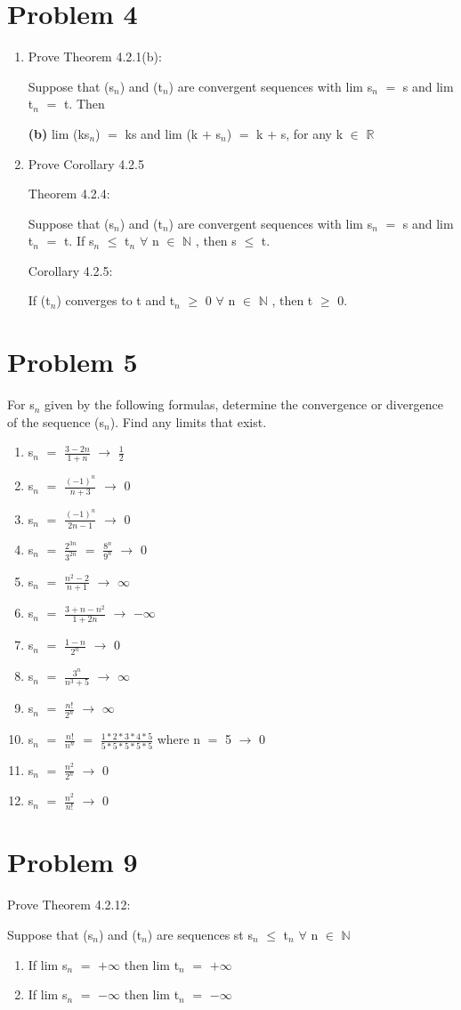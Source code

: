 \documentclass{article}
\newcommand{\mt}[1]{\ensuremath{#1}}
\newcommand\bsc[2][\DefaultOpt]{%
  \def\DefaultOpt{#2}%
  \section[#1]{#2}%
}
\newcommand{\balist}{\begin{enumerate}[label=\alph*.]}
\newcommand{\elist}{\end{enumerate}}
\newcommand{\bpth}[1]{\textbf{(#1)}}
\newcommand{\br}{\mt{\mathbb{R}} }       %
\newcommand{\bn}{\mt{\mathbb{N}} }       %
\newcommand{\fa}{\mt{\forall} }          %
\newcommand{\mem}{\mt{\in} }
\newcommand{\lra}{ \mt{\longrightarrow} } %
\newcommand{\prn}[1]{(#1)}
\newcommand{\ps}{\mt{+} }
\newcommand{\lse}{\mt{\leq} }
\newcommand{\gre}{\mt{\geq} }
\newcommand{\eql}{\mt{=} }
\newcommand{\uw}[2]{#1\mt{_{#2}}}
\newcommand{\frc}[2]{\mt{\frac{#1}{#2}}}
\begin{document}
\bsc{Problem 4}{
\balist
\item Prove Theorem 4.2.1(b):
	
	Suppose that \prn{\uw{s}{n}} and (\uw{t}{n}) are convergent sequences with lim \uw{s}{n} \eql s and lim \uw{t}{n} \eql t. Then
	
	\bpth{b} lim (k\uw{s}{n}) \eql ks and lim (k \ps \uw{s}{n}) \eql k \ps s, for any k \mem \br
	
	
\item Prove Corollary 4.2.5
	
	Theorem 4.2.4:
	
	Suppose that (\uw{s}{n}) and (\uw{t}{n}) are convergent sequences with lim \uw{s}{n} \eql s and lim \uw{t}{n} \eql t. If \uw{s}{n} \lse \uw{t}{n} \fa n \mem \bn, then s \lse t.
	
	Corollary 4.2.5:
	
	If \prn{\uw{t}{n}} converges to t and \uw{t}{n} \gre 0 \fa n \mem \bn, then t \gre 0.
\elist
}

\bsc{Problem 5}{
For \uw{s}{n} given by the following formulas, determine the convergence or divergence of the sequence \prn{\uw{s}{n}}. Find any limits that exist.

\balist
\item \uw{s}{n} \eql \frc{3 - 2n}{1 + n} \lra \frc{1}{2}
\item \uw{s}{n} \eql \frc{(-1)^n}{n + 3} \lra 0
\item \uw{s}{n} \eql \frc{(-1)^n}{2n - 1} \lra 0
\item \uw{s}{n} \eql \frc{2^{3n}}{3^{2n}} \eql \frc{8^n}{9^n} \lra 0
\item \uw{s}{n} \eql \frc{n^2 - 2}{n + 1} \lra $\infty$
\item \uw{s}{n} \eql \frc{3 + n - n^2}{1 + 2n} \lra $-\infty$
\item \uw{s}{n} \eql \frc{1 - n}{2^n	} \lra 0
\item \uw{s}{n} \eql \frc{3^n}{n^3 + 5} \lra $\infty$
\item \uw{s}{n} \eql \frc{n!}{2^n} \lra $\infty$
\item \uw{s}{n} \eql \frc{n!}{n^n} \eql \frc{1 * 2 * 3 * 4 * 5}{5 * 5 * 5 * 5 * 5} where n \eql 5 \lra 0
\item \uw{s}{n} \eql \frc{n^2}{2^n} \lra 0
\item \uw{s}{n} \eql \frc{n^2}{n!} \lra 0
\elist
}

\bsc{Problem 9}{
Prove Theorem 4.2.12:

Suppose that \prn{\uw{s}{n}} and \prn{\uw{t}{n}} are sequences st \uw{s}{n} \lse \uw{t}{n} \fa n \mem \bn

\balist
\item If lim \uw{s}{n} \eql $+\infty$ then lim \uw{t}{n} \eql $+\infty$ 
\item If lim \uw{s}{n} \eql $-\infty$ then lim \uw{t}{n} \eql $-\infty$ 
\elist
}
\end{document}
